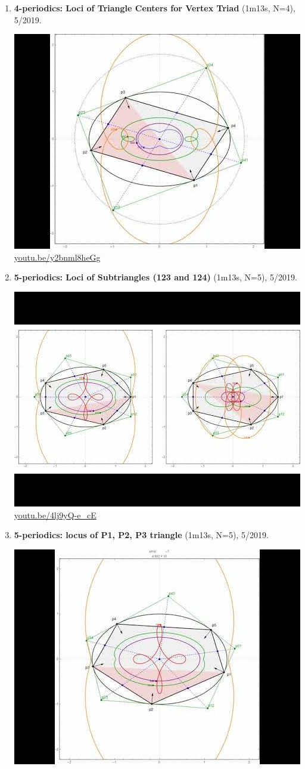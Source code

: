 \documentclass[12pt]{amsart}
\begin{document}
\begin{enumerate}[resume]
\item \textbf{4-periodics: Loci of Triangle Centers for Vertex Triad} (1m13s, N=4), 5/2019. 
\begin{center}\includegraphics[width=.5\textwidth]{pics/y2bnml8heGg.jpg} \\ 
\href{https://youtu.be/y2bnml8heGg}{\url{youtu.be/y2bnml8heGg}}\end{center}
% 
\item \textbf{5-periodics: Loci of Subtriangles (123 and 124)} (1m13s, N=5), 5/2019. 
\begin{center}\includegraphics[width=.5\textwidth]{pics/4lj9yQ-e_cE.jpg} \\ 
\href{https://youtu.be/4lj9yQ-e_cE}{\url{youtu.be/4lj9yQ-e\_cE}}\end{center}
% 
\item \textbf{5-periodics: locus of P1, P2, P3 triangle} (1m13s, N=5), 5/2019. 
\begin{center}\includegraphics[width=.5\textwidth]{pics/yQMOtAGdrqA.jpg} \\ 

\end{center}
\end{enumerate}
\end{document}

